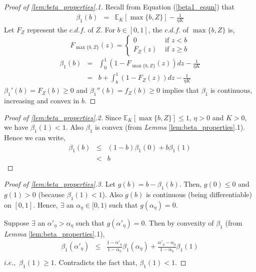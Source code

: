 \documentclass[onecolumn]{IEEEtran}
\begin{document}




 \noindent
 \begin{proof}[Proof of \ref{lem:beta_properties}.1]
 Recall from Equation (\ref{beta1_equn}) that 
 \begin{eqnarray}
 \beta_1(b)&=&\mathbb{E}_K[\max\{b,Z\}]-\frac{1}{\eta K}\nonumber
 \end{eqnarray}
 Let $F_Z$ represent the $c.d.f.$ of $Z$. For  $b\in[0,1]$, the $c.d.f.$ of $\max\{b,Z\}$ is,
 \begin{equation*}
  F_{\max\{b,Z\}}(z)=\left\{\begin{array}{ll}
                     0&\mbox{ if }z<b\\
 		    F_Z(z)&\mbox{ if }z\ge b\end{array}\right.
 \end{equation*}
 \begin{eqnarray}
  \beta_1(b)&=&\int_0^1(1-F_{\max\{b,Z\}}(z))dz-\frac{1}{\eta K}\nonumber\\
 &=&b+\int_b^1(1-F_Z(z))dz-\frac{1}{\eta K}\nonumber
 \end{eqnarray}
 ${\beta_1}'(b)=F_Z(b)\ge0$  and ${\beta_1}''(b)=f_Z(b)\ge0$ implies that $\beta_1$ is continuous, increasing and convex in $b$.
 \end{proof}
 \vspace{2mm}
 \begin{proof}[Proof of \ref{lem:beta_properties}.2]
 Since $\mathbb{E}_K[\max\{b,Z\}]\le 1$, $\eta>0$ and  $K>0$, we have  $\beta_1(1)<1$. 
 Also $\beta_1$ is convex (from \emph{Lemma} \ref{lem:beta_properties}.1). Hence we can write,
 \begin{eqnarray*}
  \beta_1(b)&\le&(1-b)\beta_1(0)+b\beta_1(1)\\
 &<&b
 \end{eqnarray*}
 \end{proof}
 \vspace{2mm}
 \begin{proof}[Proof of \ref{lem:beta_properties}.3]
   Let $g(b)=b-\beta_1(b)$. Then, $g(0)\le0$ and
   $g(1)>0$ (because $\beta_1(1)<1$). Also $g(b)$ is continuous (being differentiable) on
   $[0,1]$. Hence, $\exists$ an $\alpha_{\eta}\in[0,1)$ such that
   $g(\alpha_{\eta})=0$.

 Suppose $\exists$ an ${\alpha}'_{\eta}>{\alpha_{\eta}}$ such that
 $g({\alpha}'_{\eta})=0$. Then by convexity of $\beta_1$
 (from \emph{Lemma} \ref{lem:beta_properties}.1),
 \begin{eqnarray*}
 	\beta_1({\alpha}'_{\eta})&\le&\frac{1-{\alpha}'_{\eta}}{1-{\alpha_{\eta}}}\beta_1(\alpha_{\eta})+\frac{{\alpha}'_{\eta}-{\alpha_{\eta}}}{1-{\alpha_{\eta}}}\beta_1(1)\\
 \end{eqnarray*}
 $i.e.,$ ${\beta_1}(1)\ge1$. Contradicts the fact that, $\beta_1(1)<1$.
 \end{proof}
\end{document}
